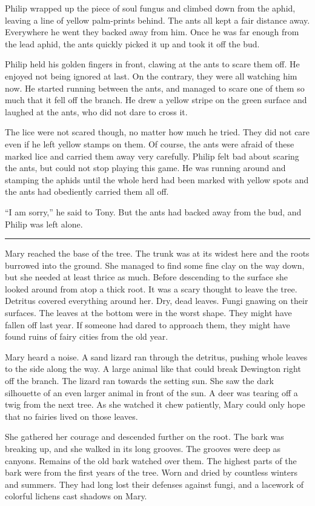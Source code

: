 \documentclass[10pt, draft]{memoir}
\renewcommand{\pfbreakdisplay}{\bigskip \ding{166} \bigskip}
\newcommand{\secbreak}{\fancybreak{\pfbreakdisplay}}
\begin{document}
Philip wrapped up the piece of soul fungus and climbed down from the aphid, leaving a line of yellow palm-prints behind. The ants all kept a fair distance away. Everywhere he went they backed away from him. Once he was far enough from the lead aphid, the ants quickly picked it up and took it off the bud.

Philip held his golden fingers in front, clawing at the ants to scare them off. He enjoyed not being ignored at last. On the contrary, they were all watching him now. He started running between the ants, and managed to scare one of them so much that it fell off the branch. He drew a yellow stripe on the green surface and laughed at the ants, who did not dare to cross it.

The lice were not scared though, no matter how much he tried.  They did not care even if he left yellow stamps on them. Of course, the ants were afraid of these marked lice and carried them away very carefully. Philip felt bad about scaring the ants, but could not stop playing this game. He was running around and stamping the aphids until the whole herd had been marked with yellow spots and the ants had obediently carried them all off.

``I am sorry,'' he said to Tony. But the ants had backed away from the bud, and Philip was left alone.

\secbreak

Mary reached the base of the tree. The trunk was at its widest here and the roots burrowed into the ground. She managed to find some fine clay on the way down, but she needed at least thrice as much. Before descending to the surface she looked around from atop a thick root. It was a scary thought to leave the tree. Detritus covered everything around her. Dry, dead leaves. Fungi gnawing on their surfaces. The leaves at the bottom were in the worst shape. They might have fallen off last year. If someone had dared to approach them, they might have found ruins of fairy cities from the old year.

Mary heard a noise. A sand lizard ran through the detritus, pushing whole leaves to the side along the way. A large animal like that could break Dewington right off the branch. The lizard ran towards the setting sun. She saw the dark silhouette of an even larger animal in front of the sun. A deer was tearing off a twig from the next tree. As she watched it chew patiently, Mary could only hope that no fairies lived on those leaves.

She gathered her courage and descended further on the root. The bark was breaking up, and she walked in its long grooves. The grooves were deep as canyons. Remains of the old bark watched over them. The highest parts of the bark were from the first years of the tree. Worn and dried by countless winters and summers. They had long lost their defenses against fungi, and a lacework of colorful lichens cast shadows on Mary.
\end{document}
